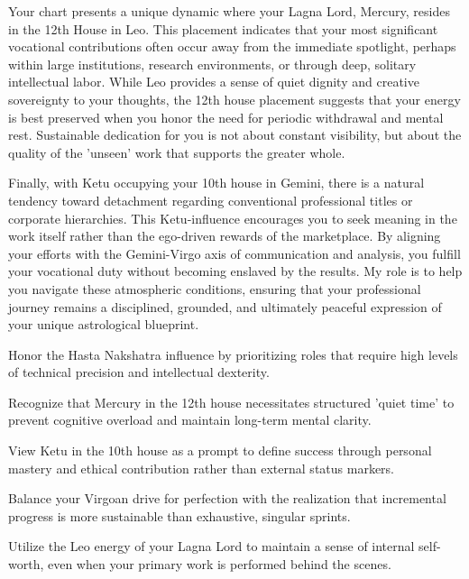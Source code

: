 {\fontsize{9}{13}\selectfont Your chart presents a unique dynamic where your Lagna Lord, Mercury, resides in the 12th House in Leo. This placement indicates that your most significant vocational contributions often occur away from the immediate spotlight, perhaps within large institutions, research environments, or through deep, solitary intellectual labor. While Leo provides a sense of quiet dignity and creative sovereignty to your thoughts, the 12th house placement suggests that your energy is best preserved when you honor the need for periodic withdrawal and mental rest. Sustainable dedication for you is not about constant visibility, but about the quality of the 'unseen' work that supports the greater whole.}\par\vspace{1.8mm}

{\fontsize{9}{13}\selectfont Finally, with Ketu occupying your 10th house in Gemini, there is a natural tendency toward detachment regarding conventional professional titles or corporate hierarchies. This Ketu-influence encourages you to seek meaning in the work itself rather than the ego-driven rewards of the marketplace. By aligning your efforts with the Gemini-Virgo axis of communication and analysis, you fulfill your vocational duty without becoming enslaved by the results. My role is to help you navigate these atmospheric conditions, ensuring that your professional journey remains a disciplined, grounded, and ultimately peaceful expression of your unique astrological blueprint.}\par\vspace{1.8mm}

\begin{diamondlist}
  \item {\fontsize{8.5}{12}\selectfont Honor the Hasta Nakshatra influence by prioritizing roles that require high levels of technical precision and intellectual dexterity.}
  \item {\fontsize{8.5}{12}\selectfont Recognize that Mercury in the 12th house necessitates structured 'quiet time' to prevent cognitive overload and maintain long-term mental clarity.}
  \item {\fontsize{8.5}{12}\selectfont View Ketu in the 10th house as a prompt to define success through personal mastery and ethical contribution rather than external status markers.}
  \item {\fontsize{8.5}{12}\selectfont Balance your Virgoan drive for perfection with the realization that incremental progress is more sustainable than exhaustive, singular sprints.}
  \item {\fontsize{8.5}{12}\selectfont Utilize the Leo energy of your Lagna Lord to maintain a sense of internal self-worth, even when your primary work is performed behind the scenes.}
\end{diamondlist}

